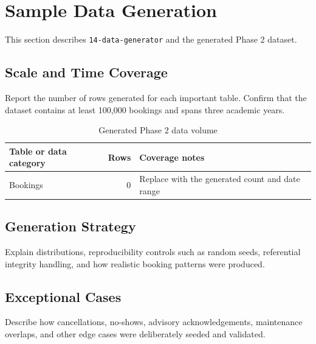 \section{Sample Data Generation}
\label{sec:sample-data}

This section describes \texttt{14-data-generator} and the generated Phase 2
dataset.

\subsection{Scale and Time Coverage}
Report the number of rows generated for each important table. Confirm that the
dataset contains at least 100,000 bookings and spans three academic years.

\begin{table}[htbp]
    \centering
    \begin{tabularx}{\textwidth}{X r X}
        \toprule
        \textbf{Table or data category} & \textbf{Rows} & \textbf{Coverage notes} \\
        \midrule
        Bookings & 0 & Replace with the generated count and date range \\
        \bottomrule
    \end{tabularx}
    \caption{Generated Phase 2 data volume}
    \label{tab:generated-data-volume}
\end{table}

\subsection{Generation Strategy}
Explain distributions, reproducibility controls such as random seeds, referential
integrity handling, and how realistic booking patterns were produced.

\subsection{Exceptional Cases}
Describe how cancellations, no-shows, advisory acknowledgements, maintenance
overlaps, and other edge cases were deliberately seeded and validated.
